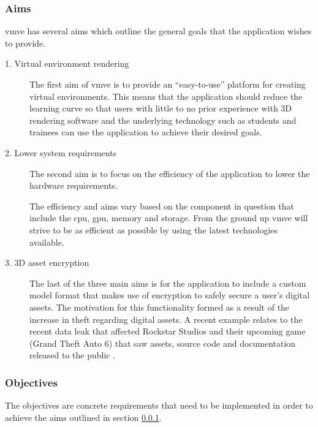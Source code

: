 \documentclass[11pt]{article}
\begin{document}
\subsubsection{Aims} \label{aims} 
\gls*{vmve} has several aims which outline the general goals that the
application wishes to provide.

\begin{description}
  \item[1. Virtual environment rendering] The first aim of \gls*{vmve} is to
    provide an ``easy-to-use'' platform for creating virtual environments. This
    means that the application should reduce the learning curve so that users
    with little to no prior experience with 3D rendering software and the
    underlying technology such as students and trainees can use the application
    to achieve their desired goals.

  \item[2. Lower system requirements] The second aim is to focus on the
    efficiency of the application to lower the hardware requirements. 
    
    The
    efficiency and aims vary based on the component in question that include the
    \gls*{cpu}, \gls*{gpu}, memory and storage. From the ground up \gls*{vmve}
    will strive to be as efficient as possible by using the latest technologies
    available.

  \item[3. 3D asset encryption] The last of the three main aims is for the
    application to include a custom model format that makes use of encryption to
    safely secure a user's digital assets. The motivation for this functionality
    formed as a result of the increase in theft regarding digital assets. A
    recent example relates to the recent data leak that affected Rockstar
    Studios and their upcoming game (Grand Theft Auto 6) that saw assets, source
    code and documentation released to the public \cite{gta_leak}.

\end{description}


\subsubsection{Objectives} \label{objectives}
The objectives are concrete requirements that need to be implemented in order
to achieve the aims outlined in section \ref{aims}.
\end{document}
